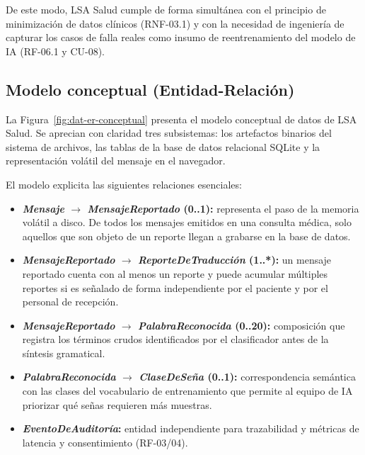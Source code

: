 De este modo, LSA Salud cumple de forma simultánea con el principio de
minimización de datos clínicos (RNF-03.1) y con la necesidad de ingeniería de
capturar los casos de falla reales como insumo de reentrenamiento del modelo
de IA (RF-06.1 y CU-08).

\subsection{Modelo conceptual (Entidad-Relación)}

La Figura~\ref{fig:dat-er-conceptual} presenta el modelo conceptual de datos de
LSA Salud. Se aprecian con claridad tres subsistemas: los artefactos binarios
del sistema de archivos, las tablas de la base de datos relacional SQLite y la
representación volátil del mensaje en el navegador.


El modelo explicita las siguientes relaciones esenciales:
\begin{itemize}[leftmargin=*, itemsep=2pt]
    \item \textbf{\textit{Mensaje} $\rightarrow$ \textit{MensajeReportado} (0..1):}
    representa el paso de la memoria volátil a disco. De todos los mensajes
    emitidos en una consulta médica, solo aquellos que son objeto de un reporte
    llegan a grabarse en la base de datos.
    \item \textbf{\textit{MensajeReportado} $\rightarrow$ \textit{ReporteDeTraducción} (1..*):}
    un mensaje reportado cuenta con al menos un reporte y puede acumular
    múltiples reportes si es señalado de forma independiente por el paciente y
    por el personal de recepción.
    \item \textbf{\textit{MensajeReportado} $\rightarrow$ \textit{PalabraReconocida} (0..20):}
    composición que registra los términos crudos identificados por el clasificador
    antes de la síntesis gramatical.
    \item \textbf{\textit{PalabraReconocida} $\rightarrow$ \textit{ClaseDeSeña} (0..1):}
    correspondencia semántica con las clases del vocabulario de entrenamiento
    que permite al equipo de IA priorizar qué señas requieren más muestras.
    \item \textbf{\textit{EventoDeAuditoría}:} entidad independiente para
    trazabilidad y métricas de latencia y consentimiento (RF-03/04).
\end{itemize}

